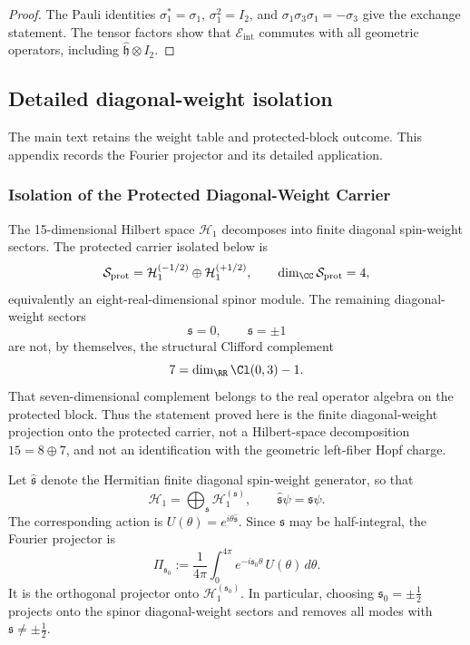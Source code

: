 \documentclass[11pt,a4paper]{article}
\begin{document}
\begin{proof}
The Pauli identities
\(\sigma_1^*=\sigma_1\),
\(\sigma_1^2=I_2\), and
\(\sigma_1\sigma_3\sigma_1=-\sigma_3\)
give the exchange statement.  The tensor factors show that
\(\mathcal E_{\mathrm{int}}\) commutes with all geometric operators,
including \(\hat{\mathfrak h}\otimes I_2\).
\end{proof}


\subsection{Detailed diagonal-weight isolation}
\label{p2d:app:diagonal-weight-isolation}
The main text retains the weight table and protected-block outcome.  This
appendix records the Fourier projector and its detailed application.

\subsubsection{Isolation of the Protected Diagonal-Weight Carrier}
\label{p2:subsec:auxiliary-decoupling}

The 15-dimensional Hilbert space \(\mathcal H_1\) decomposes into finite
diagonal spin-weight sectors.  The protected carrier isolated below is
\[
  \mathcal S_{\rm prot}=\mathcal H_1^{(-1/2)}\oplus\mathcal H_1^{(+1/2)},
  \qquad
  \dim_\CC\mathcal S_{\rm prot}=4,
\]
equivalently an eight-real-dimensional spinor module.  The remaining
diagonal-weight sectors
\[
  \mathfrak s=0,\qquad \mathfrak s=\pm1
\]
are not, by themselves, the structural Clifford complement
\[
  7=\dim_\RR\Cl(0,3)-1.
\]
That seven-dimensional complement belongs to the real operator algebra on the
protected block.  Thus the statement proved here is the finite diagonal-weight
projection onto the protected carrier, not a Hilbert-space decomposition
\(15=8\oplus7\), and not an identification with the geometric
left-fiber Hopf
charge.

\begin{proposition}
\label{p2:prop:diagonal-weight-projection}
Let \(\hat{\mathfrak s}\) denote the Hermitian finite diagonal spin-weight generator, so that
\[
\mathcal H_1=\bigoplus_{\mathfrak s}\mathcal H_1^{(\mathfrak s)},
\qquad
\hat{\mathfrak s}\psi=\mathfrak s\psi.
\]
The corresponding action is \(U(\theta)=e^{i\theta\hat{\mathfrak s}}\).  Since \(\mathfrak s\) may be half-integral, the Fourier projector is
\begin{equation}
\Pi_{\mathfrak s_0}
:=
\frac{1}{4\pi}
\int_0^{4\pi}
e^{-i\mathfrak s_0\theta}\,U(\theta)\,d\theta.
\end{equation}
It is the orthogonal projector onto \(\mathcal H_1^{(\mathfrak s_0)}\). In particular, choosing \(\mathfrak s_0=\pm\tfrac12\) projects onto the spinor diagonal-weight sectors and removes all modes with \(\mathfrak s\neq\pm\tfrac12\).
\end{proposition}
\end{document}
